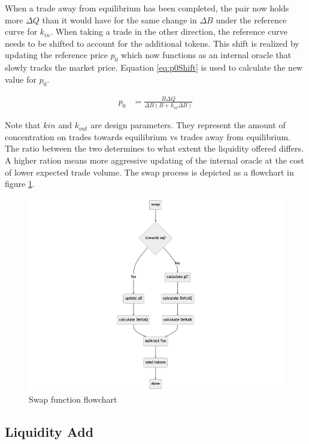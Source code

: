 When a trade away from equilibrium has been completed, the pair now holds more $\Delta Q$ than it would have for the same change in $\Delta B$ under the reference curve for $k_{in}$. When taking a trade in the other direction, the reference curve needs to be shifted to account for the additional tokens. This shift is realized by updating the reference price $p_0$ which now functions as an internal oracle that slowly tracks the market price. Equation \ref{eq:p0Shift} is used to calculate the new value for $p_0$.

\begin{align} \label{eq:p0Shift}
  p_0 &= \frac{B \Delta Q}{\Delta B \left( B + k_{in} \Delta B \right)}
\end{align}

Note that $k{in}$ and $k_{out}$ are design parameters. They represent the amount of concentration on trades towards equilibrium vs trades away from equilibrium. The ratio between the two determines to what extent the liquidity offered differs. A higher ration means more aggressive updating of the internal oracle at the cost of lower expected trade volume. The swap process is depicted as a flowchart in figure \ref{fig:flowchart}.

\begin{figure} 
  \centering
    \includegraphics[scale=0.5]{flowchart.png} 
    \caption{Swap function flowchart}
      \label{fig:flowchart}
\end{figure}


\subsection{Liquidity Add}

